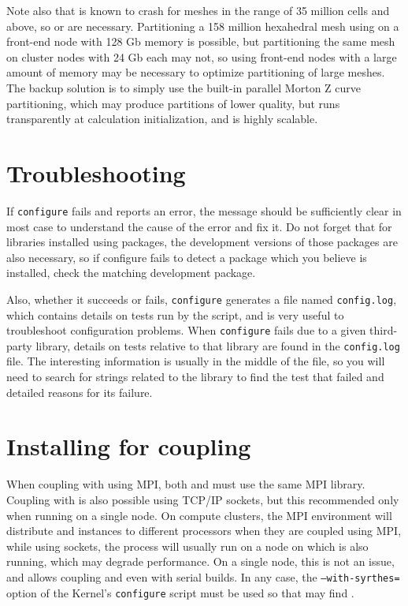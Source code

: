 \documentclass[a4paper,10pt,twoside]{article}
\begin{document}
Note also that  is known to crash for meshes in the range of
35 million cells and above, so  or \scotch are necessary.
Partitioning a 158 million hexahedral mesh using 
on a front-end node with 128 Gb memory is possible,
but partitioning the same mesh on cluster nodes with 24 Gb each
may not, so using front-end nodes with a large amount of memory may be
necessary to optimize partitioning of large meshes.
The backup solution is to simply use the built-in parallel Morton Z curve
partitioning, which may produce partitions of lower quality, but
runs transparently at \CS calculation initialization, and is highly
scalable.

\section{Troubleshooting\label{sec:config:troubleshoot}}

If \texttt{configure} fails and reports an error, the message should
be sufficiently clear in most case to understand the cause of the
error and fix it. Do not forget that for libraries installed using
packages, the development versions of those packages are also
necessary, so if configure fails to detect a package which you
believe is installed, check the matching development package.

Also, whether it succeeds or fails, \texttt{configure} generates
a file named \texttt{config.log}, which contains details on tests
run by the script, and is very useful to troubleshoot
configuration problems. When \texttt{configure} fails due to a given
third-party library, details on tests relative to that library
are found in the \texttt{config.log} file. The interesting information
is usually in the middle of the file, so you will need to search
for strings related to the library to find the test that failed
and detailed reasons for its failure.

\section{Installing for \syrthes coupling\label{sec:syrthes}}

When coupling with \syrthes using MPI, both \CS and \syrthes must
use the same MPI library. Coupling with \syrthes is also possible
using TCP/IP sockets, but this recommended only
when running on a single node. On compute clusters, the MPI environment
will distribute \syrthes and \CS instances to different processors when
they are coupled using MPI, while using sockets, the \syrthes process will
usually run on a node on which \CS is also running, which may degrade
performance. On a single node, this is not an issue, and allows coupling
\CS and \syrthes even with serial builds.
In any case, the \texttt{--with-syrthes=} option of the
Kernel's \texttt{configure} script must be used so that
\CS may find \syrthes.
\end{document}
